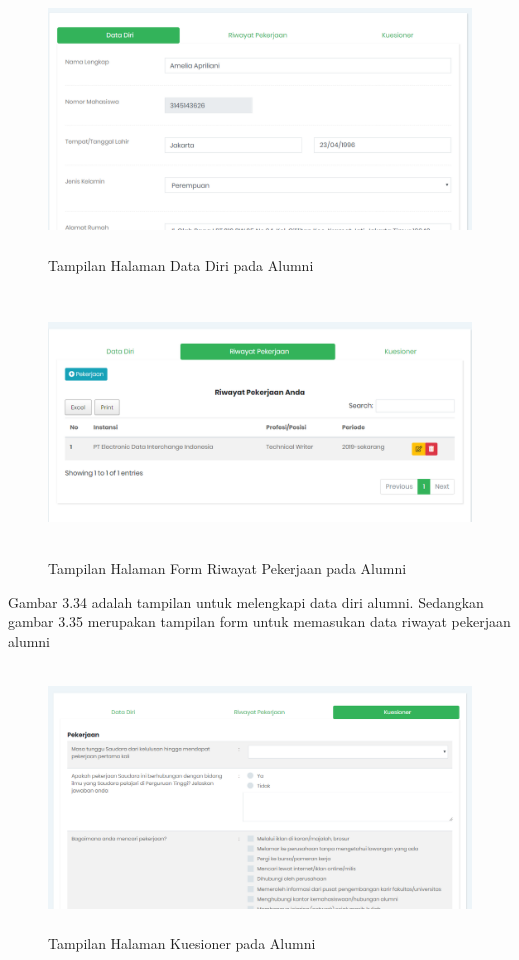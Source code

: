 \begin{figure}[H]
	\centering
	\includegraphics[width=14cm,height=7cm]{gambar/tampilan/alumni_profil}
	\caption{Tampilan Halaman Data Diri pada Alumni }
	\label{ui_alumniProfil}
\end{figure}

\begin{figure}[H]
	\centering
	\includegraphics[width=14cm,height=7cm]{gambar/tampilan/alumni_pekerjaan}
	\caption{Tampilan Halaman Form Riwayat Pekerjaan pada Alumni }
	\label{ui_alumniInputPekerjaan}
\end{figure}

Gambar 3.34 adalah tampilan untuk melengkapi data diri alumni. Sedangkan gambar 3.35 merupakan tampilan form untuk memasukan data riwayat pekerjaan alumni

\begin{figure}[H]
	\centering
	\includegraphics[width=14cm,height=7cm]{gambar/tampilan/alumni_kuesioner}
	\caption{Tampilan Halaman Kuesioner pada Alumni }
	\label{ui_alumniKuesioner}
\end{figure}

